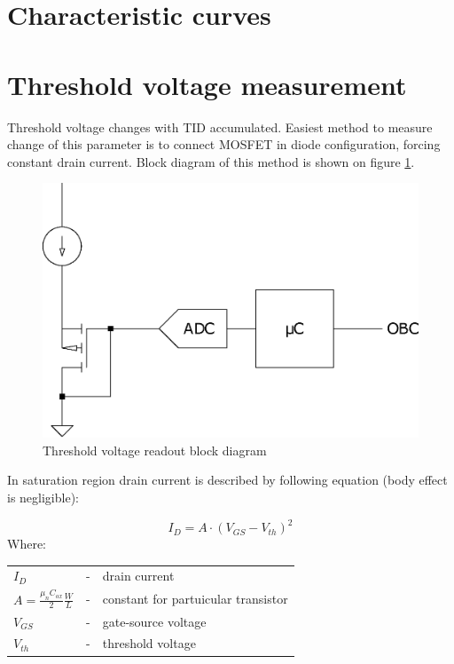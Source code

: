 \section{Characteristic curves}
\label{Characteristic_curves}

\section{Threshold voltage measurement}
    Threshold voltage changes with TID accumulated. Easiest method to measure change of this parameter is to connect MOSFET in diode configuration, forcing constant drain current. Block diagram of this method is shown on figure \ref{Vth_readout_block_diagram}.

    \begin{figure}[H]
        \centering
        \includegraphics[width=0.3\paperwidth]{img/conceptual_block_diagram.eps}
        \caption{Threshold voltage readout block diagram}
        \label{Vth_readout_block_diagram}
    \end{figure}

    In saturation region drain current is described by following equation (body effect is negligible):

    $$I_D = A \cdot (V_{GS} - V_{th})^2$$
    Where:

    \begin{tabular}{lcl}
        $I_D$ & - & drain current \\
        $A = \frac{\mu_n C_{ox}}{2} \frac{W}{L}$ & - & constant for partuicular transistor \\
        $V_{GS}$ & - & gate-source voltage \\
        $V_{th}$ & - & threshold voltage \\
    \end{tabular}
    \bigskip

